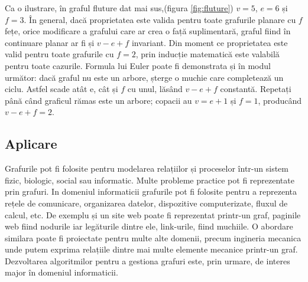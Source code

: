 
Ca o ilustrare, în graful fluture dat mai sus,(figura \ref{fig:fluture}) \(v = 5\), \(e = 6\) și \(f = 3\). În general, dacă proprietatea este valida 
pentru toate grafurile planare cu \(f\) fețe, orice modificare a grafului care ar crea o față suplimentară, graful 
fiind în continuare planar ar fi și \(v - e + f\) invariant. Din moment ce proprietatea este valid pentru toate grafurile 
cu \(f = 2\), prin inducție matematică este valabilă pentru toate cazurile. Formula lui Euler poate fi demonstrata și în 
modul următor: dacă graful nu este un arbore, șterge o muchie care completează un ciclu. Astfel scade atât e, cât și 
\(f\) cu unul, lăsând \(v - e + f\) constantă. Repetați până când graficul rămas este un arbore; copacii au \(v = e + 1\) și \(f = 1\), 
producând \(v - e + f = 2\).\newline

\subsection{Aplicare}

Grafurile pot fi folosite pentru modelarea relațiilor și proceselor într-un sistem fizic, biologic, 
social sau informatic. Multe probleme practice pot fi reprezentate prin grafuri. In domeniul informaticii 
grafurile pot fi folosite pentru a reprezenta rețele de comunicare, organizarea datelor, dispozitive computerizate, 
fluxul de calcul, etc. De exemplu și un site web poate fi reprezentat printr-un graf, paginile web fiind nodurile 
iar legăturile dintre ele, link-urile, fiind muchiile. O abordare similara poate fi proiectate pentru multe alte domenii, 
precum ingineria mecanica unde putem exprima relațiile dintre mai multe elemente mecanice printr-un graf. Dezvoltarea 
algoritmilor pentru a gestiona grafuri este, prin urmare, de interes major în domeniul informaticii.










